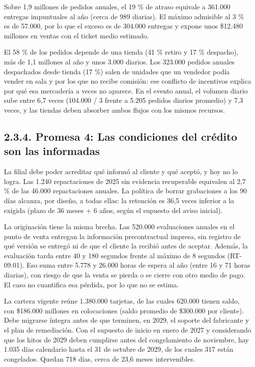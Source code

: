 \documentclass[11pt]{article}
\begin{document}
Sobre 1,9 millones de pedidos anuales, el 19 \% de atraso equivale a 361.000 entregas impuntuales al año (cerca de 989 diarias). El máximo admisible al 3 \% es de 57.000, por lo que el exceso es de 304.000 entregas y expone unos \$12.480 millones en ventas con el ticket medio estimado.

El 58 \% de los pedidos depende de una tienda (41 \% retiro y 17 \% despacho), más de 1,1 millones al año y unos 3.000 diarios. Los 323.000 pedidos anuales despachados desde tienda (17 \%) salen de unidades que un vendedor podía vender en sala y por los que no recibe comisión: ese conflicto de incentivos explica por qué esa mercadería a veces no aparece. En el evento anual, el volumen diario sube entre 6,7 veces (104.000 / 3 frente a 5.205 pedidos diarios promedio) y 7,3 veces, y las tiendas deben absorber ambos flujos con los mismos recursos.

\subsection{2.3.4. Promesa 4: Las condiciones del crédito son las informadas}\label{promesa-4-las-condiciones-del-credito-son-las-informadas}

La filial debe poder acreditar qué informó al cliente y qué aceptó, y hoy no lo logra. Las 1.240 repactaciones de 2025 sin evidencia recuperable equivalen al 2,7 \% de las 46.000 repactaciones anuales. La política de borrar grabaciones a los 90 días alcanza, por diseño, a todas ellas: la retención es 36,5 veces inferior a la exigida (plazo de 36 meses + 6 años, según el supuesto del aviso inicial).

La originación tiene la misma brecha. Las 520.000 evaluaciones anuales en el punto de venta entregan la información precontractual impresa, sin registro de qué versión se entregó ni de que el cliente la recibió antes de aceptar. Además, la evaluación tarda entre 40 y 180 segundos frente al máximo de 8 segundos (RT-09.01). Eso suma entre 5.778 y 26.000 horas de espera al año (entre 16 y 71 horas diarias), con riesgo de que la venta se pierda o se cierre con otro medio de pago. El caso no cuantifica esa pérdida, por lo que no se estima.

La cartera vigente reúne 1.380.000 tarjetas, de las cuales 620.000 tienen saldo, con \$186.000 millones en colocaciones (saldo promedio de \$300.000 por cliente). Debe migrarse íntegra antes de que terminen, en 2029, el soporte del fabricante y el plan de remediación. Con el supuesto de inicio en enero de 2027 y considerando que los hitos de 2029 deben cumplirse antes del congelamiento de noviembre, hay 1.035 días calendario hasta el 31 de octubre de 2029, de los cuales 317 están congelados. Quedan 718 días, cerca de 23,6 meses intervenibles.
\end{document}
